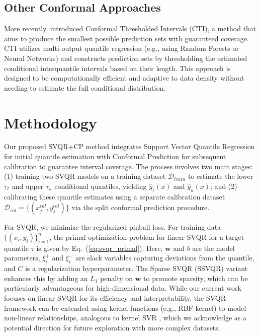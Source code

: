 \documentclass{article}
\begin{document}
\subsection{Other Conformal Approaches}
\label{sec:other_conformal_approaches}
More recently, \citet{Luo2025CTI} introduced Conformal Thresholded Intervals (CTI), a method that aims to produce the smallest possible prediction sets with guaranteed coverage. CTI utilizes multi-output quantile regression (e.g., using Random Forests or Neural Networks) and constructs prediction sets by thresholding the estimated conditional interquantile intervals based on their length. This approach is designed to be computationally efficient and adaptive to data density without needing to estimate the full conditional distribution.

\section{Methodology}
\label{sec:methodology}
Our proposed SVQR+CP method integrates Support Vector Quantile Regression for initial quantile estimation with Conformal Prediction for subsequent calibration to guarantee interval coverage. The process involves two main stages: (1) training two SVQR models on a training dataset $\mathcal{D}_{train}$ to estimate the lower $\tau_{\ell}$ and upper $\tau_u$ conditional quantiles, yielding $\hat{y}_{\ell}(x)$ and $\hat{y}_{u}(x)$; and (2) calibrating these quantile estimates using a separate calibration dataset $\mathcal{D}_{cal} = \{(x_j^{cal}, y_j^{cal})\}$ via the split conformal prediction procedure.

For SVQR, we minimize the regularized pinball loss. For training data $\{(x_i, y_i)\}_{i=1}^n$, the primal optimization problem for linear SVQR for a target quantile $\tau$ is given by Eq.~(\ref{eq:svqr_primal}).
Here, $\mathbf{w}$ and $b$ are the model parameters, $\xi_i^+$ and $\xi_i^-$ are slack variables capturing deviations from the quantile, and $C$ is a regularization hyperparameter. The Sparse SVQR (SSVQR) variant enhances this by adding an $L_1$ penalty on $\mathbf{w}$ to promote sparsity, which can be particularly advantageous for high-dimensional data. While our current work focuses on linear SVQR for its efficiency and interpretability, the SVQR framework can be extended using kernel functions (e.g., RBF kernel) to model non-linear relationships, analogous to kernel SVR \citep{Takeuchi2006NonparametricQE}, which we acknowledge as a potential direction for future exploration with more complex datasets.
\end{document}
